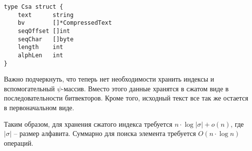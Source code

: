 \newpage
\begin{lstlisting}[caption=CSA structure]
type Csa struct {
	text      string
	bv        []*CompressedText
	seqOffset []int
	seqChar   []byte
	length    int
	alphLen   int
}
\end{lstlisting}

Важно подчеркнуть, что теперь нет необходимости хранить индексы и вспомогательный $\psi$-массив.
Вместо этого данные хранятся в сжатом виде в последовательности битвекторов.
Кроме того, исходный текст все так же остается в первоначальном виде.

Таким образом, для хранения сжатого индекса требуется $n \cdot \log |\sigma| + o(n)$,
где $|\sigma|$ -- размер алфавита. Суммарно для поиска элемента требуется $O(n\cdot \log n)$ операций.

